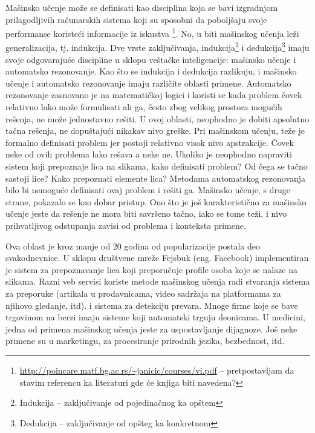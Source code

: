 Mašinsko učenje može se definisati kao disciplina koja se bavi izgradnjom prilagodljivih računarskih sistema koji su sposobni da poboljšaju svoje performanse koristeći informacije iz iskustva \footnote{\url{http://poincare.matf.bg.ac.rs/~janicic/courses/vi.pdf} -- pretpostavljam da stavim referencu ka literaturi gde će knjiga biti navedena?}. No, u biti mašinskog učenja leži generalizacija, tj. indukcija. Dve vrste zaključivanja, indukcija\footnote{Indukcija -- zaključivanje od pojedinačnog ka opštem} i dedukcija\footnote{Dedukcija -- zaključivanje od opšteg ka konkretnom} imaju svoje odgovarajuće discipline u sklopu veštačke inteligencije: mašinsko učenje i automatsko rezonovanje. Kao što se indukcija i dedukcija razlikuju, i mašinsko učenje i automatsko rezonovanje imaju različite oblasti primene. Automatsko rezonovanje zasnovano je na matematičkoj logici i koristi se kada problem čovek relativno lako može formulisati ali ga, često zbog velikog prostora mogućih rešenja, ne može jednostavno rešiti. U ovoj oblasti, neophodno je dobiti apsolutno tačna rešenja, ne dopuštajući nikakav nivo greške.
Pri mašinskom učenju, teže je formalno definisati problem jer postoji relativno visok nivo apstrakcije. Čovek neke od ovih problema lako rešava a neke ne. Ukoliko je neophodno napraviti sistem koji prepoznaje lica na slikama, kako definisati problem? Od čega se tačno sastoji lice? Kako prepoznati elemente lica? Metodama automatskog rezonovanja bilo bi nemoguće definisati ovaj problem i rešiti ga. Mašinsko učenje, s druge strane, pokazalo se kao dobar pristup. Ono što je još karakteristično za mašinsko učenje jeste da rešenje ne mora biti savršeno tačno, iako se tome teži, i nivo prihvatljivog odstupanja zavisi od problema i konteksta primene. \par

Ova oblast je kroz manje od 20 godina od popularizacije postala deo svakodnevnice. U sklopu društvene mreže Fejsbuk (eng. Facebook) implementiran je sistem za prepoznavanje lica koji preporučuje profile osoba koje se nalaze na slikama. Razni veb servisi koriste metode mašinskog učenja radi stvaranja sistema za preporuke (artikala u prodavnicama, video sadržaja na platformama za njihovo gledanje, itd). i sistema za detekciju prevara. Mnoge firme koje se bave trgovinom na berzi imaju sisteme koji automatski trguju deonicama. U medicini, jedna od primena mašinskog učenja jeste za uspostavljanje dijagnoze. Još neke primene su u marketingu, za procesiranje prirodnih jezika, bezbednost, itd.


